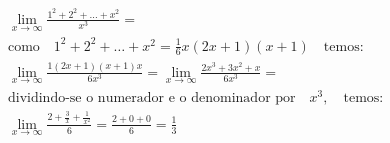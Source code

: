 \begin{ex}
\begin{align}
&\lim_{x\rightarrow \infty} \frac{1^2+2^2+\dots+x^2}{x^3}=\nonumber\\
&\text{como}\quad 1^2+2^2+\dots+x^2=\frac{1}{6}x(2x+1)(x+1)\quad\text{temos:}\nonumber\\
&\lim_{x\rightarrow \infty} \frac{1(2x+1)(x+1)x}{6x^3}=\lim_{x\rightarrow \infty} \frac{2x^3+3x^2+x}{6x^3}=\nonumber\\
&\text{dividindo-se o numerador e o denominador por}\quad x^3,\quad\text{temos:}\nonumber\\
&\lim_{x\rightarrow \infty} \frac{2+\frac{3}{x}+\frac{1}{x^2}}{6}=\frac{2+0+0}{6}=\frac{1}{3}\nonumber
\end{align}
\end{ex}
